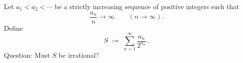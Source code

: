 Let $a_1<a_2<\cdots$ be a strictly increasing sequence of positive integers such that
\[
\frac{a_n}{n}\to \infty \qquad (n\to\infty).
\]
Define
\[
S\;:=\;\sum_{n=1}^{\infty} \frac{a_n}{2^{a_n}}\,.
\]
Question: Must $S$ be irrational?
